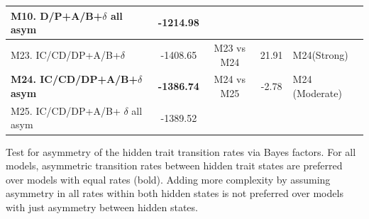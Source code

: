 \begin{supptable}
\begin{tabular}{|l|c|c|c|l|}
M10. D/P+A/B+$\delta$ all asym        & -1214.98                     &                    &                         &                         \\ \hline
M23. IC/CD/DP+A/B+$\delta$                 & -1408.65                     &     M23 vs M24                & 21.91                   & M24(Strong)     \\
\textbf{M24. IC/CD/DP+A/B+$\delta$ asym} & \textbf{-1386.74}                     &   M24 vs M25              & -2.78                   & M24 (Moderate) \\
M25. IC/CD/DP+A/B+ $\delta$ all asym     & -1389.52                     &                     &                         &                         \\ \hline
\end{tabular}
\caption{Test for asymmetry of the hidden trait transition rates via Bayes factors. For all models, asymmetric transition rates between hidden trait states are preferred over models with equal rates (bold). Adding more complexity by assuming asymmetry in all rates within both hidden states is not preferred over models with just asymmetry between hidden states.} 
\label{supptable:asymmetry}
\end{supptable}


